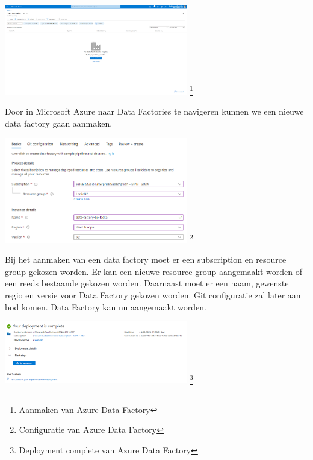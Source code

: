 \begin{center}
    \includegraphics[width=0.6\textwidth]{./graphics/adf/initial.png}
    \footnote{Aanmaken van Azure Data Factory}
\end{center}

Door in Microsoft Azure naar Data Factories te navigeren kunnen we een nieuwe data factory gaan aanmaken.

\begin{center}
    \includegraphics[width=0.6\textwidth]{./graphics/adf/initial_create.png}
    \footnote{Configuratie van Azure Data Factory}
\end{center}

Bij het aanmaken van een data factory moet er een subscription en resource group gekozen worden. Er kan een nieuwe resource group aangemaakt worden of een reeds bestaande gekozen worden. Daarnaast moet er een naam, gewenste regio en versie voor Data Factory gekozen worden. Git configuratie zal later aan bod komen. Data Factory kan nu aangemaakt worden.

\begin{center}
    \includegraphics[width=0.6\textwidth]{./graphics/adf/deployment_complete_specific.png}
    \footnote{Deployment complete van Azure Data Factory}
\end{center}

